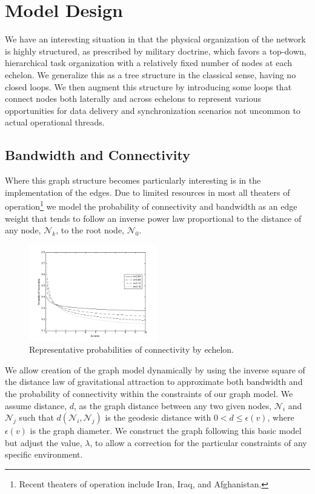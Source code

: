\documentclass[10pt]{./IEEEtran}
\begin{document}
\section{Model Design}
We have an interesting situation in that the physical organization of the network is highly structured, as prescribed by military doctrine, which favors a top-down, hierarchical task organization with a relatively fixed number of nodes at each echelon.  We generalize this as a tree structure in the classical sense, having no closed loops.  We then augment this structure by introducing some loops that connect nodes both laterally and across echelons to represent various opportunities for data delivery and synchronization scenarios not uncommon to actual operational threads.

\subsection{Bandwidth and Connectivity}

Where this graph structure becomes particularly interesting is in the implementation of the edges.  Due to limited resources in most all theaters of operation\footnote{Recent theaters of operation include Iran, Iraq, and Afghanistan.} we model the probability of connectivity and bandwidth as an edge weight that tends to follow an inverse power law proportional to the distance of any node, $\mathscr{N}_{k}$, to the root node, $\mathscr{N}_{0}$.

\begin{figure}[h!]
  \centering
    \includegraphics[width=0.5\textwidth]{images/prob_con}
  \caption{Representative probabilities of connectivity by echelon.}
\end{figure}

We allow creation of the graph model dynamically by using the inverse square of the distance law of gravitational attraction to approximate both bandwidth and the probability of connectivity within the constraints of our graph model.   We assume distance, $d$, as the graph distance between any two given nodes, $\mathscr{N}_i$ and $\mathscr{N}_j$ such that $d(\mathscr{N}_{i}, \mathscr{N}_{j})$ is the geodesic distance with $0<d\leq \epsilon(v)$, where $\epsilon(v)$ is the graph diameter.  We construct the graph following this basic model but adjust the value, $\lambda$, to allow a correction for the particular constraints of any specific environment.
\end{document}
